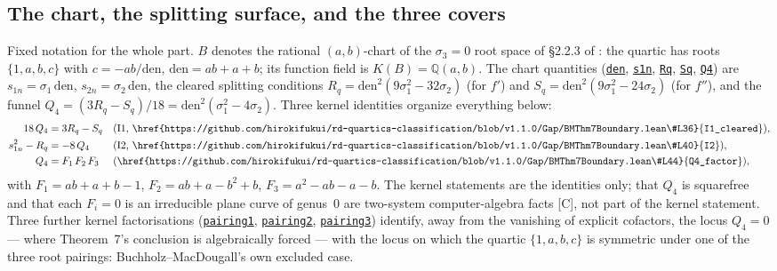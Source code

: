 \documentclass[11pt]{amsart}
\newcommand{\Q}{\mathbb{Q}}
\newcommand{\repourl}{https://github.com/hirokifukui/rd-quartics-classification}
\newcommand{\repotag}{v1.1.0}
\newcommand{\leanline}[3]{\href{\repourl/blob/\repotag/#1\#L#2}{\texttt{#3}}}
\begin{document}
\subsection{The chart, the splitting surface, and the three covers}
\label{sec:boundary:chart}

Fixed notation for the whole part.  $B$ denotes the rational
$(a,b)$-chart of the $\sigma_{3}=0$ root space of \S2.2.3 of
\cite{BM2000}: the quartic has roots $\{1,a,b,c\}$ with
$c=-ab/\mathrm{den}$, $\mathrm{den}=ab+a+b$; its function field is
$K(B)=\Q(a,b)$.  The chart quantities
(\leanline{Gap/BMThm7Boundary.lean}{19}{den},
\leanline{Gap/BMThm7Boundary.lean}{21}{s1n},
\leanline{Gap/BMThm7Boundary.lean}{25}{Rq},
\leanline{Gap/BMThm7Boundary.lean}{27}{Sq},
\leanline{Gap/BMThm7Boundary.lean}{29}{Q4}) are
$s_{1n}=\sigma_{1}\,\mathrm{den}$, $s_{2n}=\sigma_{2}\,\mathrm{den}$,
the cleared splitting conditions
$R_{q}=\mathrm{den}^{2}(9\sigma_{1}^{2}-32\sigma_{2})$ (for $f'$) and
$S_{q}=\mathrm{den}^{2}(9\sigma_{1}^{2}-24\sigma_{2})$ (for $f''$), and
the funnel
$Q_{4}=(3R_{q}-S_{q})/18=\mathrm{den}^{2}(\sigma_{1}^{2}-4\sigma_{2})$.
Three kernel identities organize everything below:
\begin{align}
18\,Q_{4}&=3R_{q}-S_{q}
&&\text{(I1, \leanline{Gap/BMThm7Boundary.lean}{36}{I1\_cleared})},
\label{eq:I1}\\
s_{1n}^{2}-R_{q}&=-8\,Q_{4}
&&\text{(I2, \leanline{Gap/BMThm7Boundary.lean}{40}{I2})},
\label{eq:I2}\\
Q_{4}&=F_{1}\,F_{2}\,F_{3}
&&\text{(\leanline{Gap/BMThm7Boundary.lean}{44}{Q4\_factor})},
\label{eq:Q4factor}
\end{align}
with $F_{1}=ab+a+b-1$, $F_{2}=ab+a-b^{2}+b$, $F_{3}=a^{2}-ab-a-b$.
The kernel statements are the identities only; that $Q_{4}$ is
squarefree and that each $F_{i}=0$ is an irreducible plane curve of
genus~$0$ are two-system computer-algebra facts [C], not part of the
kernel statement.  Three further kernel factorisations
(\leanline{Gap/BMThm7Boundary.lean}{50}{pairing1},
\leanline{Gap/BMThm7Boundary.lean}{55}{pairing2},
\leanline{Gap/BMThm7Boundary.lean}{60}{pairing3}) identify, away from
the vanishing of explicit cofactors, the locus $Q_{4}=0$ --- where
Theorem~7's conclusion is algebraically forced --- with the locus on which the
quartic $\{1,a,b,c\}$ is symmetric under one of the three root
pairings: Buchholz--MacDougall's own excluded case.
\end{document}
